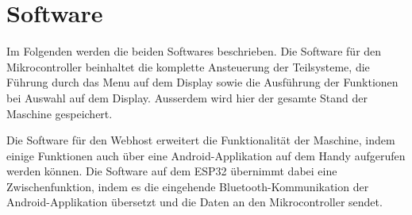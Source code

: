 \newpage
\section{Software}
\label{sec:Software}

Im Folgenden werden die beiden Softwares beschrieben. Die Software für den Mikrocontroller beinhaltet die komplette Ansteuerung der Teilsysteme, die Führung durch das Menu auf dem Display sowie die Ausführung der Funktionen bei Auswahl auf dem Display. Ausserdem wird hier der gesamte Stand der Maschine gespeichert.

Die Software für den Webhost erweitert die Funktionalität der Maschine, indem einige Funktionen auch über eine Android-Applikation auf dem Handy aufgerufen werden können. Die Software auf dem ESP32 übernimmt dabei eine Zwischenfunktion, indem es die eingehende Bluetooth-Kommunikation der Android-Applikation übersetzt und die Daten an den Mikrocontroller sendet.